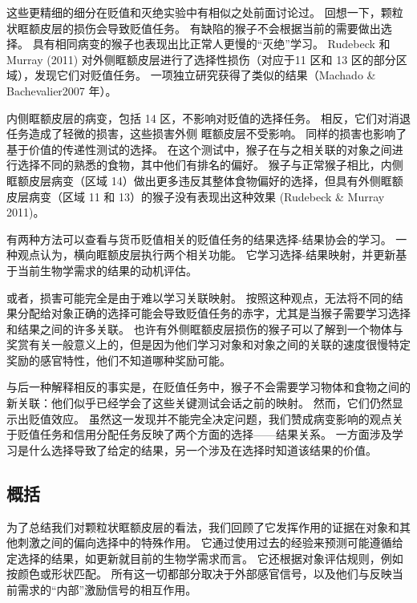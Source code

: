 这些更精细的细分在贬值和灭绝实验中有相似之处前面讨论过。
回想一下，颗粒状眶额皮层的损伤会导致贬值任务。
有缺陷的猴子不会根据当前的需要做出选择。
具有相同病变的猴子也表现出比正常人更慢的“灭绝”学习。
Rudebeck 和 Murray (2011) 对外侧眶额皮层进行了选择性损伤（对应于11 区和 13 区的部分区域），发现它们对贬值任务。
一项独立研究获得了类似的结果（Machado \& Bachevalier2007 年）。\par


内侧眶额皮层的病变，包括 14 区，不影响对贬值的选择任务。
相反，它们对消退任务造成了轻微的损害，这些损害外侧 眶额皮层不受影响。
同样的损害也影响了基于价值的传递性测试的选择。
在这个测试中，猴子在与之相关联的对象之间进行选择不同的熟悉的食物，其中他们有排名的偏好。
猴子与正常猴子相比，内侧眶额皮层病变（区域 14）做出更多违反其整体食物偏好的选择，但具有外侧眶额皮层病变（区域 11 和 13）的猴子没有表现出这种效果 (Rudebeck \& Murray 2011)。\par


有两种方法可以查看与货币贬值相关的贬值任务的结果选择-结果协会的学习。
一种观点认为，横向眶额皮层执行两个相关功能。
它学习选择-结果映射，并更新基于当前生物学需求的结果的动机评估。\par


或者，损害可能完全是由于难以学习关联映射。
按照这种观点，无法将不同的结果分配给对象正确的选择可能会导致贬值任务的赤字，尤其是当猴子需要学习选择和结果之间的许多关联。
也许有外侧眶额皮层损伤的猴子可以了解到一个物体与奖赏有关一般意义上的，但是因为他们学习对象和对象之间的关联的速度很慢特定奖励的感官特性，他们不知道哪种奖励可能。\par


与后一种解释相反的事实是，在贬值任务中，猴子不会需要学习物体和食物之间的新关联：他们似乎已经学会了这些关键测试会话之前的映射。
然而，它们仍然显示出贬值效应。
虽然这一发现并不能完全决定问题，我们赞成病变影响的观点关于贬值任务和信用分配任务反映了两个方面的选择——结果关系。
一方面涉及学习是什么选择导致了给定的结果，另一个涉及在选择时知道该结果的价值。\par



\subsection{概括}

为了总结我们对颗粒状眶额皮层的看法，我们回顾了它发挥作用的证据在对象和其他刺激之间的偏向选择中的特殊作用。
它通过使用过去的经验来预测可能遵循给定选择的结果，如更新就目前的生物学需求而言。
它还根据对象评估规则，例如按颜色或形状匹配。
所有这一切都部分取决于外部感官信号，以及他们与反映当前需求的“内部”激励信号的相互作用。\par


